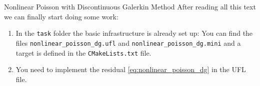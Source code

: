 \documentclass[12pt,a4paper]{article}
\begin{document}
\begin{Exercise}{Nonlinear Poisson with Discontinuous Galerkin Method}
  After reading all this text we can finally start doing some work:
  \begin{enumerate}
  \item In the \lstinline{task} folder the basic infrastructure is already set
    up: You can find the files \lstinline{nonlinear_poisson_dg.ufl} and
    \lstinline{nonlinear_poisson_dg.mini} and a target is defined in the
    \lstinline{CMakeLists.txt} file.
  \item You need to implement the residual \eqref{eq:nonlinear_poisson_dg} in
    the UFL file.
  \end{enumerate}

\end{Exercise}
\end{document}
